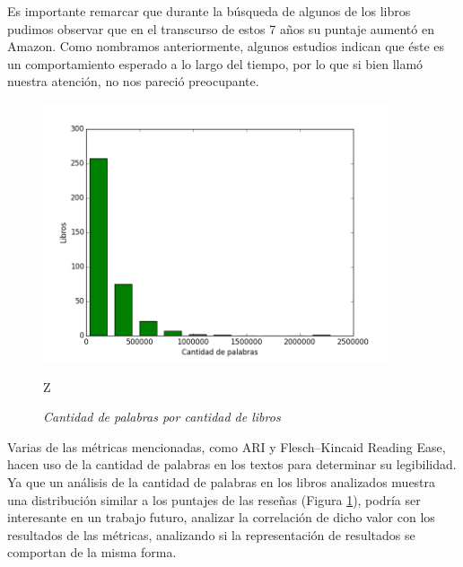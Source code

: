 \documentclass[12pt,journal,compsoc]{IEEEtran}
\begin{document}
Es importante remarcar que durante la búsqueda de algunos de los libros pudimos observar que en el transcurso de estos 7 años su puntaje aumentó en Amazon. Como nombramos anteriormente, algunos estudios indican que éste es un comportamiento esperado a lo largo del tiempo\cite{zhang}, por lo que si bien llamó nuestra atención, no nos pareció preocupante.

\begin{figure}[H]
\begin{center}
  \includegraphics[width=4.0in]{../unigrams/scripts/histogram/histogramaDePalabras.png}
  \caption{\small \textit{Cantidad de palabras por cantidad de libros}}Z
  \label{fig:cantPalabrasVsCantLibros}
  \end{center}
\end{figure}

Varias de las métricas mencionadas, como ARI y Flesch–Kincaid Reading Ease, hacen uso de la cantidad de palabras en los textos para determinar su legibilidad. Ya que un análisis de la cantidad de palabras en los libros analizados muestra una distribución similar a los puntajes de las reseñas (Figura \ref{fig:cantPalabrasVsCantLibros}), podría ser interesante en un trabajo futuro, analizar la correlación de dicho valor con los resultados de las métricas, analizando si la representación de resultados se comportan de la misma forma.
\end{document}

